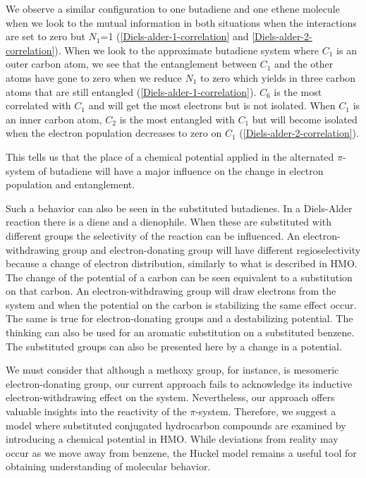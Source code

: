\documentclass[twoside,twocolumn,9pt]{article}
\begin{document}
We observe a similar configuration to one butadiene and one ethene molecule when we look to the mutual information in both situations when the interactions are set to zero but $N_1$=1 (\cref{Diels-alder-1-correlation} and \cref{Diels-alder-2-correlation}). When we look to the approximate butadiene system where $C_1$ is an outer carbon atom, we see that the entanglement between $C_1$ and the other atoms have gone to zero when we reduce $N_1$ to zero which yields in three carbon atoms that are still entangled (\cref{Diels-alder-1-correlation}). $C_6$ is the most correlated with $C_1$ and will get the most electrons but is not isolated. When $C_1$ is an inner carbon atom, $C_2$ is the most entangled with $C_1$ but will become isolated when the electron population decreases to zero on $C_1$ (\cref{Diels-alder-2-correlation}).

This tells us that the place of a chemical potential applied in the alternated $\pi$-system of butadiene will have a major influence on the change in electron population and entanglement.

Such a behavior can also be seen in the substituted butadienes. In a Diels-Alder reaction there is a diene and a dienophile. When these are substituted with different groups the selectivity of the reaction can be influenced. An electron-withdrawing group and electron-donating group will have different regioselectivity because a change of electron distribution, similarly to what is described in HMO. The change of the potential of a carbon can be seen equivalent to a substitution on that carbon. An electron-withdrawing group will draw electrons from the system and when the potential on the carbon is stabilizing the same effect occur. The same is true for electron-donating groups and a destabilizing potential. The thinking can also be used for an aromatic substitution on a substituted benzene. The substituted groups can also be presented here by a change in a potential.

We must consider that although a methoxy group, for instance, is mesomeric electron-donating group, our current approach fails to acknowledge its inductive electron-withdrawing effect on the system. Nevertheless, our approach offers valuable insights into the reactivity of the $\pi$-system. Therefore, we suggest a model where substituted conjugated hydrocarbon compounds are examined by introducing a chemical potential in HMO. While deviations from reality may occur as we move away from benzene, the H$\ddot{\text{u}}$ckel model remains a useful tool for obtaining understanding of molecular behavior.
\end{document}
